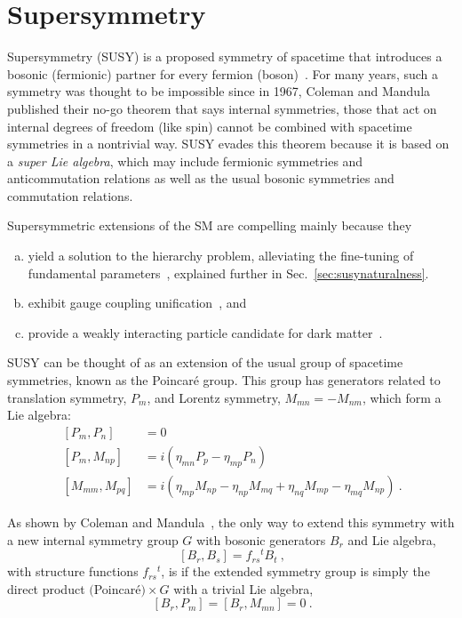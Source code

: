 \section{Supersymmetry}
\label{sec:susy}
Supersymmetry (SUSY) is a proposed symmetry of spacetime that 
introduces a bosonic (fermionic) partner for every fermion
(boson)~\cite{Wess,Golfand,Volkov,Chamseddine,Kane,Fayet,Barbieri,Hall,Ramond}. For
many years, such a symmetry was thought to be impossible since in 1967,
Coleman and Mandula~\cite{PhysRev.159.1251} published their no-go theorem that says
internal symmetries, those that act on internal degrees of
freedom (like spin) cannot be combined with spacetime symmetries in a
nontrivial way. SUSY evades this theorem because it is based
on a \emph{super Lie algebra}, which may include fermionic symmetries
and anticommutation relations as well as the usual bosonic symmetries
and commutation relations.

Supersymmetric extensions of the SM are compelling mainly because they 
\begin{enumerate}[(a)]
\item yield a solution to the hierarchy problem, alleviating
the fine-tuning of fundamental
parameters~\cite{Witten:1981nf,Dimopoulos:1981zb,Dine:1981za,Dimopoulos:1981au,Sakai:1981gr,Kaul:1981hi},
explained further in Sec.~\ref{sec:susynaturalness}.
\item exhibit gauge coupling
  unification~\cite{Dimopoulos:1981yj,Marciano:1981un,Einhorn:1981sx,Ibanez:1981yh,Amaldi:1991cn,Langacker:1995fk}, and
\item provide a weakly interacting particle candidate for dark matter~\cite{Ellis:1983ew,Jungman:1995df}.
\end{enumerate}

SUSY can be thought of as an extension of the usual group of spacetime
symmetries, known as the Poincar\'{e} group. This group has
generators related to translation symmetry, $P_m$, and Lorentz
symmetry, $M_{mn} = -M_{nm}$, which form a Lie algebra:
\begin{align}
~[P_m,P_n] &= 0 \nonumber\\
~[P_m,M_{np}] &= i(\eta_{mn}P_p-\eta_{mp}P_n) \nonumber\\
~[M_{mm},M_{pq}] &= i(\eta_{mp}M_{np} - \eta_{np}M_{mq} +
                   \eta_{nq}M_{mp} - \eta_{mq}M_{np} )~.
\label{eqn:poincare}
\end{align}

As shown by Coleman and Mandula~\cite{PhysRev.159.1251}, the only way
to extend this symmetry with a new internal symmetry group $G$ with bosonic
generators $B_r$ and Lie algebra,
\begin{equation}
~[B_r,B_s] = f_{rs}{}^tB_t~,
\end{equation}
with structure functions $f_{rs}{}^t$, is if the extended symmetry
group is simply the direct product $($Poincar\'{e}$)\times G$ with a
trivial Lie algebra,
\begin{equation}
~[B_r,P_m] = [B_r,M_{mn}] = 0~.
\end{equation}

